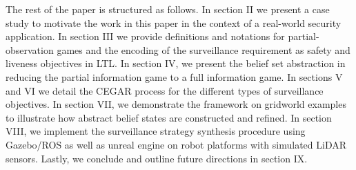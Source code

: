 The rest of the paper is structured as follows. In section II we present a case study to motivate the work in this paper in the context of a real-world security application. In section III we provide definitions and notations for partial-observation games and the encoding of the surveillance requirement as safety and liveness objectives in LTL. In section IV, we present the belief set abstraction in reducing the partial information game to a full information game. In sections V and VI we detail the CEGAR process for the different types of surveillance objectives. In section VII, we demonstrate the framework on gridworld examples to illustrate how abstract belief states are constructed and refined. In section VIII, we implement the surveillance strategy synthesis procedure using Gazebo/ROS as well as unreal engine on robot platforms with simulated LiDAR sensors. Lastly, we conclude and outline future directions in section IX.  





